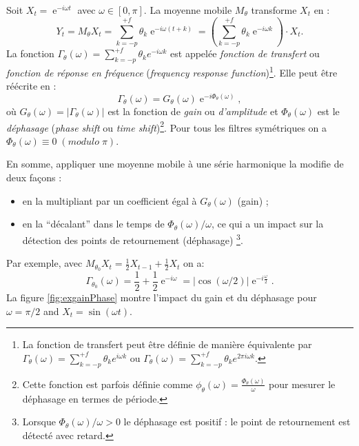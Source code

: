 \documentclass[
  11pt,
  french,
  a4paper]{article}
\DeclareMathOperator{\e}{e}
\newcommand\1{\mathds{1}}
\begin{document}
Soit \(X_t=\e^{-i\omega t}\) avec \(\omega\in[0,\pi]\). La moyenne mobile \(M_\theta\) transforme \(X_t\) en :
\[
Y_t = M_{\theta}X_t = \sum_{k=-p}^{+f} \theta_k \e^{-i \omega (t+k)}
= \left(\sum_{k=-p}^{+f} \theta_k \e^{-i \omega k}\right)\cdot X_t.
\]
La fonction \(\Gamma_\theta(\omega)=\sum_{k=-p}^{+f} \theta_k e^{-i \omega k}\) est appelée \emph{fonction de transfert} ou \emph{fonction de réponse en fréquence} (\emph{frequency response function})\footnote{
  La fonction de transfert peut être définie de manière équivalente par \(\Gamma_\theta(\omega)=\sum_{k=-p}^{+f} \theta_k e^{i \omega k}\) ou \(\Gamma_\theta(\omega)=\sum_{k=-p}^{+f} \theta_k e^{2\pi i \omega k}\).}.
Elle peut être réécrite en :
\[
\Gamma_\theta(\omega) = G_\theta(\omega)\e^{-i\Phi_\theta(\omega)},
\]
où \(G_\theta(\omega)=\lvert\Gamma_\theta(\omega)\rvert\) est la fonction de \emph{gain} ou \emph{d'amplitude} et \(\Phi_\theta(\omega)\) est le \emph{déphasage} (\emph{phase shift} ou \emph{time shift})\footnote{
  Cette fonction est parfois définie comme \(\phi_\theta(\omega)=\frac{\Phi_\theta(\omega)}{\omega}\) pour mesurer le déphasage en termes de période.}.
Pour tous les filtres symétriques on a \(\Phi_\theta(\omega)\equiv 0 \;(modulo\;{\pi})\).

En somme, appliquer une moyenne mobile à une série harmonique la modifie de deux façons :

\begin{itemize}
\item
  en la multipliant par un coefficient égal à \(G_{\theta}\left(\omega\right)\) (gain) ;
\item
  en la ``décalant'' dans le temps de \(\Phi_\theta(\omega)/\omega\), ce qui a un impact sur la détection des points de retournement (déphasage) \footnote{
    Lorsque \(\Phi_\theta(\omega)/\omega>0\) le déphasage est positif : le point de retournement est détecté avec retard.}.
\end{itemize}

Par exemple, avec \(M_{\theta_0}X_t=\frac{1}{2}X_{t-1}+\frac{1}{2}X_{t}\) on a:
\[
\Gamma_{\theta_0}(\omega)=\frac{1}{2}+\frac{1}{2}\e^{-i\omega}
=\lvert\cos(\omega/2)\rvert\e^{-i\frac{\omega}{2}}.
\]
La figure \ref{fig:exgainPhase} montre l'impact du gain et du déphasage pour \(\omega=\pi/2\) and \(X_t=\sin(\omega t)\).
\end{document}
